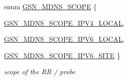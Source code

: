 \begin{DoxyCompactItemize}
enum \hyperlink{a00668_gabcc090f962c26d23957861a30b6bf166}{GSN\_\-MDNS\_\-SCOPE} \{ \par
\hyperlink{a00668_ggabcc090f962c26d23957861a30b6bf166a211fb8d41e3a558b3db60c797e4e5e62}{GSN\_\-MDNS\_\-SCOPE\_\-IPV4\_\-LOCAL}, 
\par
\hyperlink{a00668_ggabcc090f962c26d23957861a30b6bf166ac399ad8c02ad33aafa7677162b7e9540}{GSN\_\-MDNS\_\-SCOPE\_\-IPV6\_\-LOCAL}, 
\par
\hyperlink{a00668_ggabcc090f962c26d23957861a30b6bf166aaf172be006787a87aedd0d8e74c93790}{GSN\_\-MDNS\_\-SCOPE\_\-IPV6\_\-SITE}
 \}
\begin{DoxyCompactList}\small\item\em scope of the RR / probe \end{DoxyCompactList}\end{DoxyCompactItemize}

